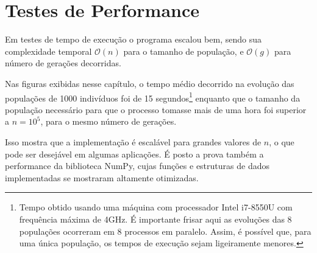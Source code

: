 \section{Testes de Performance}

Em testes de tempo de execução o programa escalou bem, sendo sua complexidade temporal $\mathcal{O}(n)$ para o
tamanho de população, e $\mathcal{O}(g)$ para número de gerações decorridas. 

Nas figuras exibidas nesse capítulo, o tempo médio decorrido na evolução das populações de 1000 indivíduos
foi de 15 segundos\footnote{
  Tempo obtido usando uma máquina com processador Intel i7-8550U com frequência máxima de 4GHz.
  É importante frisar aqui as evoluções das 8 populações ocorreram em 8 processos em paralelo.
  Assim, é possível que, para uma única população, os tempos de execução sejam ligeiramente menores.
} enquanto que o tamanho da população necessário para que o processo tomasse mais de uma hora foi
superior a $n = 10^5$, para o mesmo número de gerações.

Isso mostra que a implementação é escalável para grandes valores de $n$, o que pode ser desejável em
algumas aplicações. É posto a prova também a performance da biblioteca NumPy, cujas funções e estruturas
de dados implementadas se mostraram altamente otimizadas.